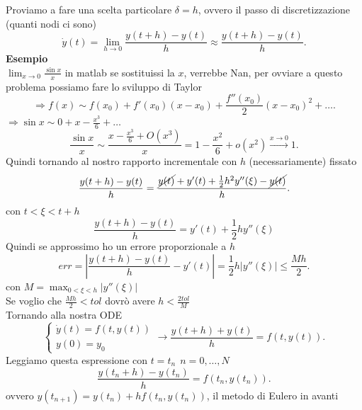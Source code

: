 \documentclass[12px]{article}
\begin{document}
	Proviamo a fare una scelta particolare $\delta = h$, ovvero il passo di discretizzazione (quanti nodi ci sono)\\
	 \[
		 \dot y(t) = \lim_{h \rightarrow 0}\frac{y(t+h)-y(t)} h\approx \frac{y(t+h) - y(t)}h
	.\] 
	\textbf{Esempio}\\
	$\lim_{x \rightarrow 0}\frac{\sin x}x$ in matlab se sostituissi la $x$, verrebbe Nan, per ovviare a questo problema possiamo fare lo sviluppo di Taylor
	\[
		\Rightarrow  f(x) \sim f(x_0) + f'(x_0)(x-x_0) + \frac{f''(x_0)} 2 (x-x_0)^2 + \ldots
	.\] 
	$ \Rightarrow  \sin x \sim 0 + x - \frac{x^3}6 + \ldots$ \\
	\[
		\frac{\sin x}x \sim \frac{x - \frac {x^3}6 + O(x^3)}x = 1 - \frac{x^2}6 + o(x^2) \xrightarrow{x \rightarrow 0} 1
	.\] 
	Quindi tornando al nostro rapporto incrementale con $h$ (necessariamente) fissato\\
	\[
		\frac{ y(t+h) - y(t)}h =\frac{ \cancel{y(t)} + y'(t) + \frac 12 h^2y''(\xi) - \cancel{y(t)}}{h}
	.\] 
	con $t < \xi < t+ h$\\
	\[\frac{y(t+h) - y(t)}h = y'(t) + \frac 12 h y''(\xi)\]
	Quindi se approssimo ho un errore proporzionale a $h$
	\[
		err = \left|\frac{y(t+h)-y(t)}h - y'(t) \right| = \frac 12h|y''(\xi)|\leq \frac{M h}2
	.\] 
	con $M = \max_{0 < \xi < h}|y''(\xi)|$ \\
	Se voglio che $\frac{Mh}2 < tol$  dovrò avere  $h < \frac {2 tol} M$\\
	Tornando alla nostra ODE
	\[
	\begin{cases}
		\dot y(t) = f(t,y(t))\\
		y(0) = y_0
	\end{cases} \rightarrow \frac{y(t+h) + y(t)}h = f(t,y(t))
	.\] 
	Leggiamo questa espressione con $t = t_n\ \ n = 0,\ldots, N$
	 \[
		 \frac{y(t_n + h) - y(t_n)}h = f(t_n,y(t_n))
	.\] 
	ovvero $y(t_{n+1}) = y(t_n) + hf(t_n,y(t_n))$, il metodo di Eulero in avanti\\
\end{document}
